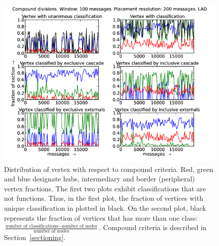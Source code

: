 \documentclass[%
 aip,
 jmp,%
 amsmath,amssymb,
 reprint,%
]{revtex4-1}
\begin{document}
\begin{figure}[hbtp] 
   \centering
        \includegraphics[width=\textwidth]{figs/LAD/100_2}
    \caption{Distribution of vertex with respect to compound criteria. Red, green and blue designate hubs, intermediary and border (peripheral) vertex fractions. The first two plots exhibit classifications that are not functions. Thus, in the first plot, the fraction of vertices with unique classification in plotted in black. On the second plot, black represents the fraction of vertices that has more than one class: $\frac{\text{number of classifications} - \text{number of nodes}}{\text{number of nodes}}$. Compound criteria is described in Section~\ref{sectioning}.}
    \label{fig:lad100_}
\end{figure}
\end{document}
